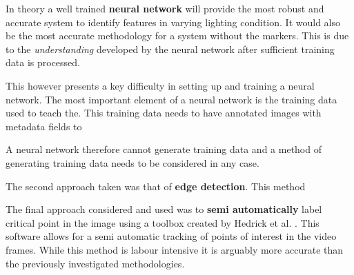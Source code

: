 In theory a well trained \textbf{neural network} will provide the most robust and accurate system to identify features in varying lighting condition. It would also be the most accurate methodology for a system without the markers. This is due to the \textit{understanding} developed by the neural network after sufficient training data is processed.

This however presents a key difficulty in setting up and training a neural network. The most important element of a neural network is the training data used to teach the. This training data needs to have annotated images with metadata fields to

A neural network therefore cannot generate training data and a method of generating training data needs to be considered in any case.

The second approach taken was that of \textbf{edge detection}. This method 

The final approach considered and used was to \textbf{semi automatically} label critical point in the image using a toolbox created by Hedrick et al. \cite{hedrick2008software}. This software allows for a semi automatic tracking of points of interest in the video frames. While this method is labour intensive it is arguably more accurate than the previously investigated methodologies.





